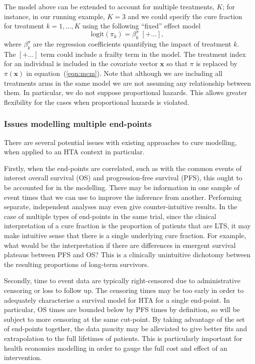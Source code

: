 \documentclass[AMA,STIX1COL]{WileyNJD-v2}
\begin{document}
The model above can be extended to account for multiple treatments, $K$; for instance, in our running example, $K=3$ and we could specify the cure fraction for treatment $k=1,\ldots,K$ using the following ``fixed'' effect model
\begin{equation}
\label{eqn:pi_regn}
\mbox{logit}(\pi_{k}) = \beta^{\pi}_{k} \; [+ \ldots],
\end{equation}
\noindent
where $\beta^{\pi}_k$ are the regression coefficients quantifying the impact of treatment $k$.
The $[+ \ldots]$ term could include a frailty term in the model.
The treatment index for an individual is included in the covariate vector $\bm{x}$ so that $\pi$ is replaced by $\pi(\bm{x})$ in equation~(\ref{eqn:mcm}).
Note that although we are including all treatments arms in the same model we are not assuming any relationship between them. In particular, we do not suppose proportional hazards. This allows greater flexibility for the cases when proportional hazards is violated.

\subsubsection{Issues modelling multiple end-points} \label{sec:issues}
There are several potential issues with existing approaches to cure modelling, when applied to an HTA context in particular.

Firstly, when the end-points are correlated, such as with the common events of interest overall survival (OS) and progression-free survival (PFS), this ought to be accounted for in the modelling.
There may be information in one sample of event times that we can use to improve the inference from another.
Performing separate, independent analyses may even give counter-intuitive results.
In the case of multiple types of end-points in the same trial, since the clinical interpretation of a cure fraction is the proportion of patients that are LTS,
it may make intuitive sense that there is a single underlying cure fraction.
For example, what would be the interpretation if there are differences in emergent survival plateaus between PFS and OS?
This is a clinically unintuitive dichotomy between the resulting proportions of long-term survivors.

Secondly, time to event data are typically right-censored due to administrative censoring or loss to follow up.
The censoring times may be too early in order to adequately characterise a survival model for HTA for a single end-point.
In particular, OS times are bounded below by PFS times by definition, so will be subject to more censoring at the same cut-point.
By taking advantage of the set of end-points together, the data paucity may be alleviated to give better fits and extrapolation to the full lifetimes of patients.
This is particularly important for health economics modelling in order to gauge the full cost and effect of an intervention.
\end{document}
